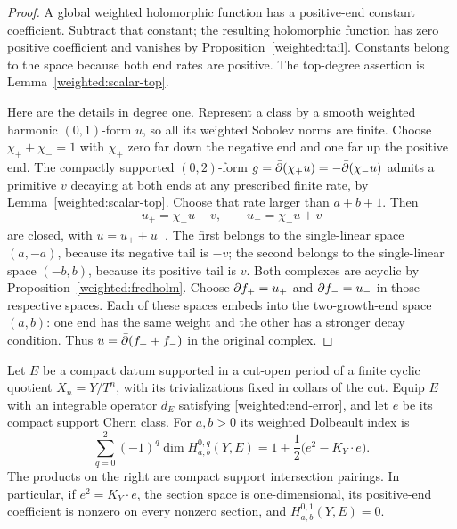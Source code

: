 \begin{proof}
A global weighted holomorphic function has a positive-end constant
coefficient. Subtract that constant; the resulting holomorphic function
has zero positive coefficient and vanishes by
Proposition~\ref{weighted:tail}. Constants belong to the space because
both end rates are positive. The top-degree assertion is
Lemma~\ref{weighted:scalar-top}.

Here are the details in degree one. Represent a class by a smooth
weighted harmonic $(0,1)$-form $u$, so all its weighted Sobolev norms
are finite. Choose $\chi_++\chi_-=1$ with $\chi_+$ zero far down the
negative end and one far up the positive end. The compactly supported
$(0,2)$-form
$g=\bar\partial(\chi_+u)=-\bar\partial(\chi_-u)$ admits a primitive $v$ decaying
at both ends at any prescribed finite rate, by
Lemma~\ref{weighted:scalar-top}. Choose that rate larger than $a+b+1$.
Then
\[
 u_+=\chi_+u-v,\qquad u_-=\chi_-u+v
\]
are closed, with $u=u_++u_-$. The first belongs to the single-linear
space $(a,-a)$, because its negative tail is $-v$; the second belongs
to the single-linear space $(-b,b)$, because its positive tail is $v$.
Both complexes are acyclic by Proposition~\ref{weighted:fredholm}.
Choose $\bar\partial f_+=u_+$ and $\bar\partial f_-=u_-$ in those respective spaces.
Each of these spaces embeds into the two-growth-end space $(a,b)$:
one end has the same weight and the other has a stronger decay
condition. Thus $u=\bar\partial(f_++f_-)$ in the original complex.
\end{proof}

\begin{proposition}\label{weighted:index}
Let $E$ be a compact datum supported in a cut-open period of a finite
cyclic quotient $X_n=Y/T^n$, with its trivializations fixed in collars
of the cut. Equip $E$ with an integrable operator $d_E$ satisfying
\eqref{weighted:end-error}, and let $e$ be its compact support Chern
class. For $a,b>0$ its weighted Dolbeault index is
\begin{equation}\label{weighted:index-formula}
 \sum_{q=0}^2(-1)^q\dim H^{0,q}_{a,b}(Y,E)
 =1+\frac12\bigl(e^2-K_Y\cdot e\bigr).
\end{equation}
The products on the right are compact support intersection pairings.
In particular, if $e^2=K_Y\cdot e$, the section space is
one-dimensional, its positive-end coefficient is nonzero on every
nonzero section, and $H^{0,1}_{a,b}(Y,E)=0$.
\end{proposition}


